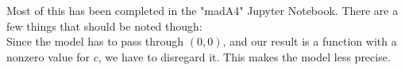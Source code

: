 Most of this has been completed in the "madA4" Jupyter Notebook. There are a few things that should be noted though:\\
Since the model has to pass through $(0,0)$, and our result is a function with a nonzero value for $c$, we have to disregard it. This makes the model less precise.